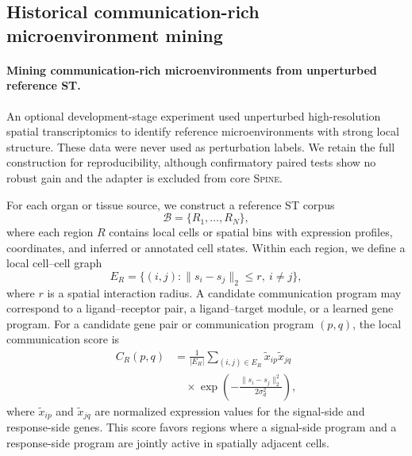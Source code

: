 \documentclass[sigconf,review,balance=false]{acmart}
\newcommand{\methodname}{\textsc{Spine}\xspace}
\begin{document}
\subsection{Historical communication-rich microenvironment mining}
\label{app:communication_microenvironment_mining}

\paragraph{Mining communication-rich microenvironments from unperturbed reference ST.}
An optional development-stage experiment used unperturbed high-resolution
spatial transcriptomics to identify reference microenvironments with strong
local structure. These data were never used as perturbation labels. We retain
the full construction for reproducibility, although confirmatory paired tests
show no robust gain and the adapter is excluded from core \methodname{}.

For each organ or tissue source, we construct a reference ST corpus
\[
\mathcal B=\{R_1,\ldots,R_N\},
\]
where each region $R$ contains local cells or spatial bins with expression profiles, coordinates, and inferred or annotated cell states. Within each region, we define a local cell--cell graph
\[
E_R=\{(i,j):\|s_i-s_j\|_2\le r,\ i\neq j\},
\]
where $r$ is a spatial interaction radius. A candidate communication program may correspond to a ligand--receptor pair, a ligand--target module, or a learned gene program. For a candidate gene pair or communication program $(p,q)$, the local communication score is
\[
\begin{aligned}
C_R(p,q)
&=
\frac{1}{|E_R|}
\sum_{(i,j)\in E_R}\tilde x_{ip}\tilde x_{jq}\\
&\quad \times
\exp\!\left(
-\frac{\|s_i-s_j\|_2^2}{2\sigma_d^2}
\right),
\end{aligned}
\]
where $\tilde x_{ip}$ and $\tilde x_{jq}$ are normalized expression values for the signal-side and response-side genes. This score favors regions where a signal-side program and a response-side program are jointly active in spatially adjacent cells.
\end{document}
